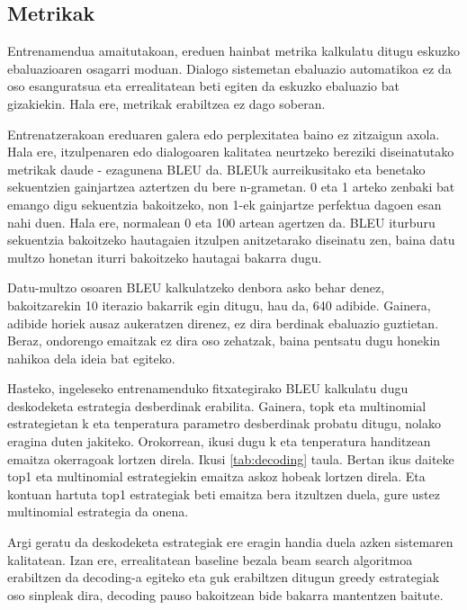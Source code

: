 \documentclass[11pt,a4paper]{article}
\begin{document}
\subsection{Metrikak}

Entrenamendua amaitutakoan, ereduen hainbat metrika kalkulatu ditugu eskuzko ebaluazioaren osagarri moduan. Dialogo sistemetan ebaluazio automatikoa ez da oso esanguratsua eta errealitatean beti egiten da eskuzko ebaluazio bat gizakiekin. Hala ere, metrikak erabiltzea ez dago soberan.

Entrenatzerakoan ereduaren galera edo perplexitatea baino ez zitzaigun axola. Hala ere, itzulpenaren edo dialogoaren kalitatea neurtzeko bereziki diseinatutako metrikak daude - ezagunena BLEU da. BLEUk aurreikusitako eta benetako sekuentzien gainjartzea aztertzen du bere n-grametan. 0 eta 1 arteko zenbaki bat emango digu sekuentzia bakoitzeko, non 1-ek gainjartze perfektua dagoen esan nahi duen. Hala ere, normalean 0 eta 100 artean agertzen da. BLEU iturburu sekuentzia bakoitzeko hautagaien itzulpen anitzetarako diseinatu zen, baina datu multzo honetan iturri bakoitzeko hautagai bakarra dugu.

Datu-multzo osoaren BLEU kalkulatzeko denbora asko behar denez, bakoitzarekin 10 iterazio bakarrik egin ditugu, hau da, 640 adibide. Gainera, adibide horiek ausaz aukeratzen direnez, ez dira berdinak ebaluazio guztietan. Beraz, ondorengo emaitzak ez dira oso zehatzak, baina pentsatu dugu honekin nahikoa dela ideia bat egiteko.

Hasteko, ingeleseko entrenamenduko fitxategirako BLEU kalkulatu dugu deskodeketa estrategia desberdinak erabilita. Gainera, topk eta multinomial estrategietan k eta tenperatura parametro desberdinak probatu ditugu, nolako eragina duten jakiteko. Orokorrean, ikusi dugu k eta tenperatura handitzean emaitza okerragoak lortzen direla. Ikusi \ref{tab:decoding} taula. Bertan ikus daiteke top1 eta multinomial estrategiekin emaitza askoz hobeak lortzen direla. Eta kontuan hartuta top1 estrategiak beti emaitza bera itzultzen duela, gure ustez multinomial estrategia da onena. 

Argi geratu da deskodeketa estrategiak ere eragin handia duela azken sistemaren kalitatean. Izan ere, errealitatean baseline bezala beam search algoritmoa erabiltzen da decoding-a egiteko eta guk erabiltzen ditugun greedy estrategiak oso sinpleak dira, decoding pauso bakoitzean bide bakarra mantentzen baitute.
\end{document}
